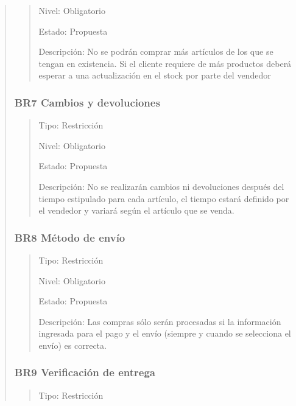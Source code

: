 \documentclass[14pt]{article}
\begin{document}
\begin{quote}
\begin{quote}
                        Nivel: Obligatorio
    
                        Estado: Propuesta
    
                        Descripción: No se podrán comprar más artículos de los que se tengan en existencia. Si el cliente requiere de más productos deberá esperar a una actualización en el stock por parte del vendedor
                    \end{quote}
                \subsubsection{BR7 Cambios y devoluciones}\label{BR7 Cambios y devoluciones}
                    \begin{quote}
                        Tipo: Restricción
    
                        Nivel: Obligatorio
    
                        Estado: Propuesta
    
                        Descripción: No se realizarán cambios ni devoluciones después del tiempo estipulado para cada artículo, el tiempo estará definido por el vendedor y variará según el artículo que se venda. 
                    \end{quote}
                \subsubsection{BR8 Método de envío}\label{BR8 Método de envío}
                    \begin{quote}
                        Tipo: Restricción
    
                        Nivel: Obligatorio
    
                        Estado: Propuesta
    
                        Descripción: Las compras sólo serán procesadas si la información ingresada para el pago y el envío (siempre y cuando se selecciona el envío) es correcta.
                    \end{quote}
                \subsubsection{BR9  Verificación de entrega}\label{BR9  Verificación de entrega}
                    \begin{quote}
                        Tipo: Restricción
                        

\end{quote}
\end{quote}
\end{document}
